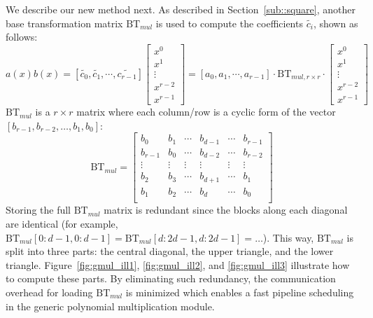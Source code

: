\documentclass[runningheads]{llncs}
\begin{document}
We describe our new method next. As described in Section~\ref{sub::square},
another base transformation matrix $\text{BT}_{mul}$ is used to compute the coefficients $\widetilde{c_{i}}$, shown as follows:
\[
a(x)b(x)= [\widetilde{c_{0}},\widetilde{c_{1}},\cdots,\widetilde{c_{r-1}}]\left[ \begin{array}{c}
x^{0} \\
x^{1} \\
\vdots\\
x^{r-2}\\
x^{r-1}
\end{array}
\right ]
=
[{a_{0}},{a_{1}},\cdots,{a_{r-1}}]
\cdot \text{BT}_{mul,r\times r} \cdot
\left[ \begin{array}{c}
x^{0} \\
x^{1} \\
\vdots\\
x^{r-2}\\
x^{r-1}
\end{array}
\right ]
\]
$\text{BT}_{mul}$ is a $r\times r$ matrix where each column/row is a cyclic form of the vector $[b_{r-1},b_{r-2},\ldots, b_{1},b_{0}]$:
\[
\text{BT}_{mul} =
\left[ \begin{array}{cccccc}
b_{0}&b_{1}&\cdots&b_{d-1}&\cdots &b_{r-1} \\
b_{r-1}&b_{0}&\cdots&b_{d-2}&\cdots &b_{r-2} \\
\vdots&\vdots&\vdots&\vdots&\vdots&\vdots\\
b_{2}&b_{3}&\cdots&b_{d+1}&\cdots &b_{1} \\
b_{1}&b_{2}&\cdots&b_{d}&\cdots &b_{0} \\
\end{array}
\right ]
\]
Storing the full $\text{BT}_{mul}$ matrix is redundant
since the blocks along each diagonal are identical
(for example, $\text{BT}_{mul}[0:d-1,0:d-1] = \text{BT}_{mul}[d:2d-1,d:2d-1] = \ldots$).
This way, $\text{BT}_{mul}$ is split into three parts: the central diagonal, the upper triangle, and the lower triangle. Figure~\ref{fig:gmul_ill1}, \ref{fig:gmul_ill2}, and \ref{fig:gmul_ill3} illustrate how to compute these parts.
By eliminating such redundancy, the communication overhead for
loading $\text{BT}_{mul}$ is minimized which enables a
fast pipeline scheduling in the generic polynomial multiplication module.
\end{document}
